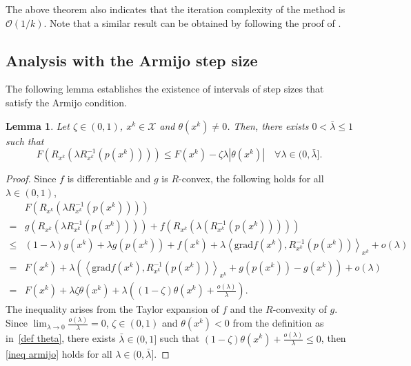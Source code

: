 \documentclass[pdflatex,sn-mathphys-num]{sn-jnl}%
\newtheorem{lemma}[theorem]{Lemma} %
\theoremstyle{definition} %
\theoremstyle{remark} %
\newcommand{\grad}{\mathrm{grad}}
\begin{document}
The above theorem also indicates that the iteration complexity of the method is $\mathcal{O} \left( 1/k \right)$.
Note that a similar result can be obtained by following the proof of \cite[Corollary~5]{yu2017generalized}. 



\subsection{Analysis with the Armijo step size}

The following lemma establishes the existence of intervals of step sizes that satisfy the Armijo condition.
\begin{lemma}\label{lemma:armijo}
    Let $\zeta \in(0,1)$, $x^k \in \mathcal{X}$ and $\theta(x^k) \neq 0$. Then, there exists $0<\bar{\lambda} \leq 1$ such that
    \begin{equation}\label{ineq armijo}
        F(R_{x^k} (\lambda R_{x^k}^{-1} (p(x^k)))) \leq F(x^k)-\zeta \lambda\left|\theta (x^k)\right|  \quad \forall \lambda \in(0, \bar{\lambda}] .
    \end{equation}
\end{lemma}
\begin{proof}
    Since $f$ is differentiable and $g$ is $R$-convex, the following holds for all $\lambda \in(0,1)$, 
    $$
    \begin{aligned}
    & F (R_{x^k} (\lambda R_{x^k}^{-1} (p(x^k)))) \\
    = & g (R_{x^k} (\lambda R_{x^k}^{-1} (p(x^k)))) + f(R_{x^k} (\lambda (R_{x^k}^{-1} (p(x^k))))) \\
    \leq & (1-\lambda) g (x^k) + \lambda g (p(x^k)) + f(x^k) + \lambda \left\langle \grad f (x^k), R_{x^k}^{-1} (p(x^k)) \right\rangle_{x^k} + {o}(\lambda) \\
    = & F (x^k) + \lambda \left( \left\langle \grad f (x^k), R_{x^k}^{-1} (p(x^k)) \right\rangle_{x^k} + g (p(x^k)) - g (x^k) \right) + {o}(\lambda) \\
    = & F(x^k) + \lambda \zeta \theta(x^k) + \lambda \left( (1-\zeta) \theta(x^k) + \frac{{o}(\lambda)}{\lambda} \right).
    \end{aligned}
    $$
    The inequality arises from the Taylor expansion of \(f\) and the $R$-convexity of \(g\).
    Since $\lim _{\lambda \rightarrow 0} \frac{{o}(\lambda)}{\lambda}=0$, $\zeta \in(0,1)$ and $\theta(x^k) < 0$ from the definition as in~\eqref{def theta}, there exists $\bar{\lambda} \in(0,1]$ such that $(1-\zeta) \theta(x^k)+\frac{{o}(\lambda)}{\lambda} \leq 0$,
    then \eqref{ineq armijo} holds for all $\lambda \in(0, \bar{\lambda}]$.
\end{proof}
\end{document}
